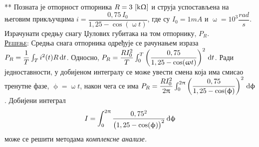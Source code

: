 {\color{red}**}\PID
Позната је  отпорност отпорника $R = 3\,\left[\mathrm{k\Upomega}\right]$ и струја
успостављена на његовим прикључцима
$i = \dfrac{0,75\,I_0}{1,25 - \cos(\upomega t)}$,
где су $I_0 = 1\unit{mA}$ и $\upomega 
= 10^3\unit{\dfrac{rad}{s}}$. Израчунати средњу снагу Џулових губитака на том отпорнику, $P_R$.
\\[2mm]

\textsc{\underline{Решење}}:
Средња снага отпорника одређује се рачунањем израза
$P_R = \dfrac{1}{T}\int_{T} i^2(t) R \, {\rm d} t$. Односно,
$P_R = \dfrac{R I_0^2}{T}\int_0^T 
\left(
\dfrac{0,75}{1,25 - \cos(\upomega t)}
\right)^2
 \, {\rm d} t$. Ради једноставности, у добијеном интегралу
 се може увести смена која има смисао 
 тренутне фазе, $\upphi = \upomega t$, након чега 
се има
$P_R = \dfrac{R I_0^2}{2\uppi }\int_0^{2\uppi} 
\left(
\dfrac{0,75}{1,25 - \cos(\upphi)}
\right)^2
 \, {\rm d} \upphi$. Добијени интеграл 
\begin{equation}
I = \int_0^{2\uppi} 
\frac{0,75^2}{
\bigl(1,25 - \cos(\upphi)\bigr)^2
}
 \, {\rm d} \upphi \label{1}
\end{equation} 
 може се решити 
методама \textit{комплексне анализе.}

